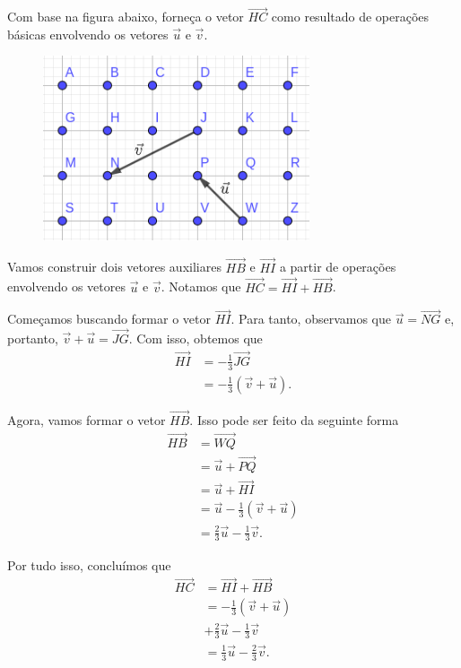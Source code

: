 \begin{exeresol}
  Com base na figura abaixo, forneça o vetor $\overrightarrow{HC}$ como resultado de operações básicas envolvendo os vetores $\vec{u}$ e $\vec{v}$.
  \begin{figure}[H]
    \centering
    \includegraphics[width=0.7\textwidth]{./cap_vetor/dados/fig_exer_op_basicas/fig_vec_soma}
  \end{figure}
\end{exeresol}
\begin{resol}
  Vamos construir dois vetores auxiliares $\overrightarrow{HB}$ e $\overrightarrow{HI}$ a partir de operações envolvendo os vetores $\vec{u}$ e $\vec{v}$. Notamos que $\overrightarrow{HC} = \overrightarrow{HI} + \overrightarrow{HB}$.

  Começamos buscando formar o vetor $\overrightarrow{HI}$. Para tanto, observamos que $\vec{u}=\overrightarrow{NG}$ e, portanto, $\vec{v}+\vec{u}=\overrightarrow{JG}$. Com isso, obtemos que
  \begin{align}
    \overrightarrow{HI} &= -\frac{1}{3}\overrightarrow{JG} \\
                        &= -\frac{1}{3}(\vec{v}+\vec{u}).
  \end{align}

  Agora, vamos formar o vetor $\overrightarrow{HB}$. Isso pode ser feito da seguinte forma
  \begin{align}
    \overrightarrow{HB} &= \overrightarrow{WQ} \\
                        &= \vec{u} + \overrightarrow{PQ} \\
                        &= \vec{u} + \overrightarrow{HI} \\
                        &= \vec{u} -\frac{1}{3}(\vec{v}+\vec{u}) \\
                        &= \frac{2}{3}\vec{u} - \frac{1}{3}\vec{v}.
  \end{align}

  Por tudo isso, concluímos que
  \begin{align}
    \overrightarrow{HC} &= \overrightarrow{HI} + \overrightarrow{HB} \\
                        &= -\frac{1}{3}(\vec{v}+\vec{u}) \\
                        &+ \frac{2}{3}\vec{u} - \frac{1}{3}\vec{v} \\
                        &= \frac{1}{3}\vec{u} - \frac{2}{3}\vec{v}.
  \end{align}
\end{resol}

